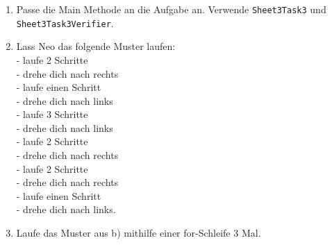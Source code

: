 
\begin{enumerate}
	\item 
		Passe die Main Methode an die Aufgabe an. 
		Verwende \lstinline{Sheet3Task3} und \lstinline{Sheet3Task3Verifier}.
	\item
		Lass Neo das folgende Muster laufen:\\
		- laufe 2 Schritte\\
		- drehe dich nach rechts\\
		- laufe einen Schritt\\
		- drehe dich nach links\\
		- laufe 3 Schritte\\
		- drehe dich nach links\\
		- laufe 2 Schritte\\
		- drehe dich nach rechts\\
		- laufe 2 Schritte\\
		- drehe dich nach rechts\\
		- laufe einen Schritt\\
		- drehe dich nach links.
	\item
		Laufe das Muster aus b) mithilfe einer for-Schleife 3 Mal.
\end{enumerate}


